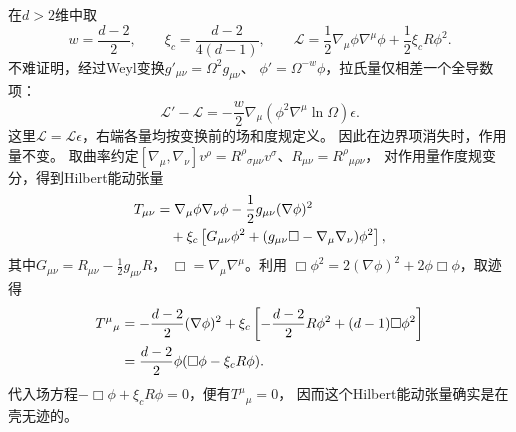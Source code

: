 \begin{example}[共形耦合的实标量场]
    在$d>2$维中取
    \begin{equation}
        w=\frac{d-2}{2},\qquad
        \xi_c=\frac{d-2}{4(d-1)},\qquad
        \mathcal L=\frac12\nabla_\mu\phi\nabla^\mu\phi
        +\frac12\xi_cR\phi^2.
    \end{equation}
    不难证明，经过Weyl变换$g'_{\mu\nu}=\Omega^2g_{\mu\nu}$、
    $\phi'=\Omega^{-w}\phi$，拉氏量仅相差一个全导数项：
    \begin{equation}
        \boldsymbol{\mathcal L}'-\boldsymbol{\mathcal L}
        =-\frac{w}{2}\nabla_\mu\!\left(\phi^2\nabla^\mu\ln\Omega\right)\epsilon.
    \end{equation}
    这里$\boldsymbol{\mathcal L}=\mathcal L\epsilon$，右端各量均按变换前的场和度规定义。
    因此在边界项消失时，作用量不变。
    取曲率约定$[\nabla_\mu,\nabla_\nu]v^\rho
    =R^\rho{}_{\sigma\mu\nu}v^\sigma$、$R_{\mu\nu}=R^\rho{}_{\mu\rho\nu}$，
    对作用量作度规变分，得到Hilbert能动张量
    \begin{align}
        T_{\mu\nu}
        &=\nabla_\mu\phi\nabla_\nu\phi
        -\frac12g_{\mu\nu}(\nabla\phi)^2\notag\\
        &\quad+\xi_c\left[G_{\mu\nu}\phi^2
        +(g_{\mu\nu}\Box-\nabla_\mu\nabla_\nu)\phi^2\right],
    \end{align}
    其中$G_{\mu\nu}=R_{\mu\nu}-\frac12g_{\mu\nu}R$，
    $\Box=\nabla_\mu\nabla^\mu$。利用
    $\Box\phi^2=2(\nabla\phi)^2+2\phi\Box\phi$，取迹得
    \begin{align}
        T^\mu{}_\mu
        &=-\frac{d-2}{2}(\nabla\phi)^2
        +\xi_c\left[-\frac{d-2}{2}R\phi^2+(d-1)\Box\phi^2\right]\notag\\
        &=\frac{d-2}{2}\phi(\Box\phi-\xi_cR\phi).
    \end{align}
    代入场方程$-\Box\phi+\xi_cR\phi=0$，便有$T^\mu{}_\mu=0$，
    因而这个Hilbert能动张量确实是在壳无迹的。
\end{example}


